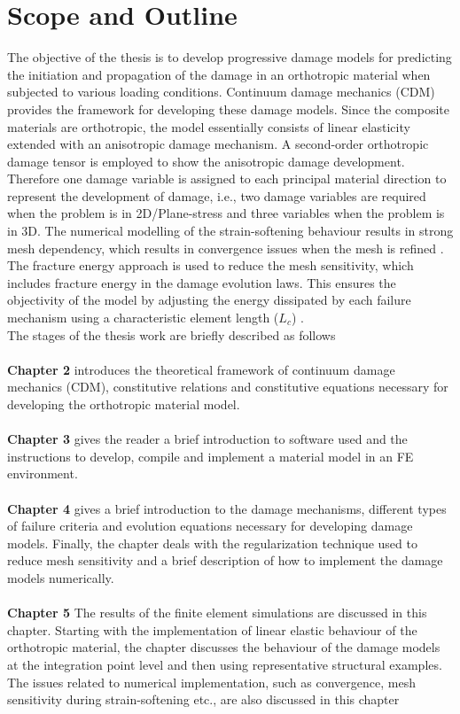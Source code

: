 \documentclass[12pt,a4paper,twoside,openright]{report}
\begin{document}
\section{Scope and Outline}
\indent\indent\indent  The objective of the thesis is to develop progressive damage models for predicting the initiation and propagation of the damage in an orthotropic material when subjected to various loading conditions. Continuum damage mechanics (CDM) provides the framework for developing these damage models. Since the composite materials are orthotropic, the model essentially consists of linear elasticity extended with an anisotropic damage mechanism. A second-order orthotropic damage tensor is employed to show the anisotropic damage development. Therefore one damage variable is assigned to each principal material direction to represent the development of damage, i.e., two damage variables are required when the problem is in 2D/Plane-stress and three variables when the problem is in 3D. The numerical modelling of the strain-softening behaviour results in strong mesh dependency, which results in convergence issues when the mesh is refined \citep{wang2009three}. The fracture energy approach is used to reduce the mesh sensitivity, which includes fracture energy in the damage evolution laws. This ensures the objectivity of the model by adjusting the energy dissipated by each failure mechanism using a characteristic element length ($L_{c}$) \citep{falzon2011numerical}.\\
The stages of the thesis work are briefly described as follows\\\\
\textbf{Chapter 2} introduces the theoretical framework of continuum damage mechanics (CDM), constitutive relations and constitutive equations necessary for developing the orthotropic material model. \\\\
\textbf{Chapter 3} gives the reader a brief introduction to software used and the instructions to develop, compile and implement a material model in an FE environment. \\\\
\textbf{Chapter 4} gives a brief introduction to the damage mechanisms, different types of failure criteria and evolution equations necessary for developing damage models. Finally, the chapter deals with the regularization technique used to reduce mesh sensitivity and a brief description of how to implement the damage models numerically. \\\\
\textbf{Chapter 5} The results of the finite element simulations are discussed in this chapter. Starting with the implementation of linear elastic behaviour of the orthotropic material, the chapter discusses the behaviour of the damage models at the integration point level and then using representative structural examples. The issues related to numerical implementation, such as convergence, mesh sensitivity
during strain-softening etc., are also discussed in this chapter
\end{document}
